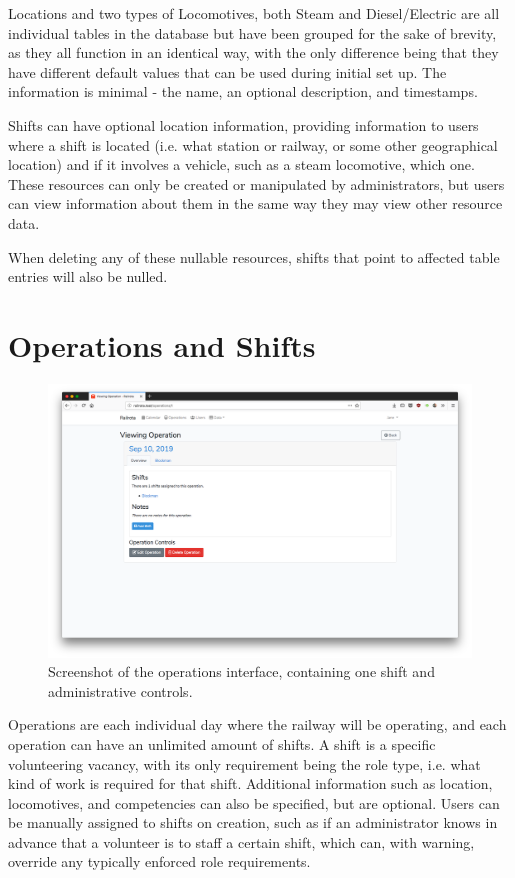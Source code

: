 Locations and two types of Locomotives, both Steam and Diesel/Electric are all individual tables in the database but have been grouped for the sake of brevity, as they all function in an identical way, with the only difference being that they have different default values that can be used during initial set up. The information is minimal - the name, an optional description, and timestamps.

Shifts can have optional location information, providing information to users where a shift is located (i.e. what station or railway, or some other geographical location) and if it involves a vehicle, such as a steam locomotive, which one. These resources can only be created or manipulated by administrators, but users can view information about them in the same way they may view other resource data.

When deleting any of these nullable resources, shifts that point to affected table entries will also be nulled.

\section{Operations and Shifts}

\begin{figure}[!ht]
    \centering
    \includegraphics[width=1.0\textwidth]{Figures/screenshot-operations}
    \caption{Screenshot of the operations interface, containing one shift and administrative controls.}
    \label{fig:operations}
\end{figure}

Operations are each individual day where the railway will be operating, and each operation can have an unlimited amount of shifts. A shift is a specific volunteering vacancy, with its only requirement being the role type, i.e. what kind of work is required for that shift. Additional information such as location, locomotives, and competencies can also be specified, but are optional. Users can be manually assigned to shifts on creation, such as if an administrator knows in advance that a volunteer is to staff a certain shift, which can, with warning, override any typically enforced role requirements.


